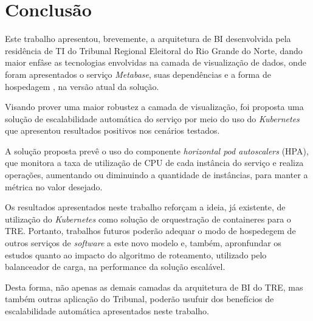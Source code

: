 \section{Conclusão}

Este trabalho apresentou, brevemente, a arquitetura de BI desenvolvida pela residência de TI do Tribunal Regional Eleitoral do Rio Grande do Norte, dando maior enfâse as tecnologias envolvidas na camada de visualização de dados, onde foram apresentados o serviço \textit{Metabase}, suas dependências e a forma de hospedagem , na versão atual da solução.

Visando prover uma maior robustez a camada de visualização, foi proposta uma solução de escalabilidade automática do serviço por meio do uso do \textit{Kubernetes} que apresentou resultados positivos nos cenários testados. 

A solução proposta prevê o uso do componente \textit{horizontal pod autoscalers} (HPA), que monitora a taxa de utilização de CPU de cada instância do serviço e realiza operações, aumentando ou diminuindo a quantidade de instâncias, para manter a métrica no valor desejado.

Os resultados apresentados neste trabalho reforçam a ideia, já existente, de utilização do \textit{Kubernetes} como solução de orquestração de containeres para o TRE. Portanto, trabalhos futuros poderão adequar o modo de hospedegem de outros serviços de \textit{software} a este novo modelo e, também, apronfundar os estudos quanto ao impacto do algoritmo de roteamento, utilizado pelo balanceador de carga, na performance da solução escalável. 

Desta forma, não apenas as demais camadas da arquitetura de BI do TRE, mas também outras aplicação do Tribunal, poderão usufuir dos benefícios de escalabilidade automática apresentados neste trabalho. 